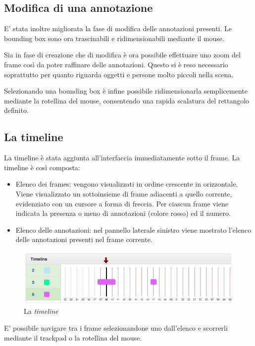\subsection{Modifica di una annotazione}

E' stata inoltre migliorata la fase di modifica delle annotazioni presenti. Le bounding box sono ora trascinabili e ridimensionabili mediante il mouse. 

Sia in fase di creazione che di modifica è ora possibile effettuare uno zoom del frame così da poter raffinare delle annotazioni. Questo si è reso necessario soprattutto per quanto riguarda oggetti e persone molto piccoli nella scena. 

Selezionando una bounding box è infine possibile ridimensionarla semplicemente mediante la rotellina del mouse, consentendo una rapida scalatura del rettangolo definito.

\subsection{La timeline}

La timeline è stata aggiunta all'interfaccia immediatamente sotto il frame. La timeline è così composta:
\begin{itemize}
\item Elenco dei frames: vengono visualizzati in ordine crescente in orizzontale. Viene visualizzato un sottoinsieme di frame adiacenti a quello corrente, evidenziato con un cursore a forma di freccia. Per ciascun frame viene indicata la presenza o meno di annotazioni (colore rosso) ed il numero.
\item Elenco delle annotazioni: nel pannello laterale sinistro viene mostrato l'elenco delle annotazioni presenti nel frame corrente.
\end{itemize}

\begin{figure}[h]
\centering
\includegraphics[width=1\linewidth]{images/timeline.jpg}
  \caption{La \emph{timeline}}
  \label{fig:timeline}
\end{figure}

E' possibile navigare tra i frame selezionandone uno dall'elenco e scorrerli mediante il trackpad o la rotellina del mouse.

